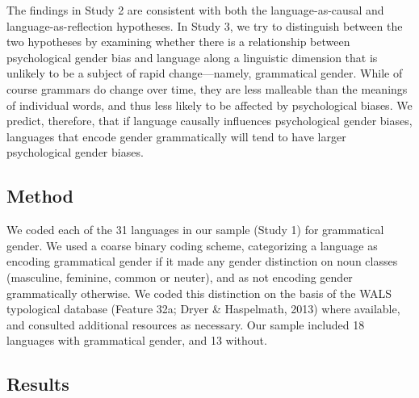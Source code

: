 \documentclass[10pt, letterpaper]{article}
\begin{document}
The findings in Study 2 are consistent with both the language-as-causal
and language-as-reflection hypotheses. In Study 3, we try to distinguish
between the two hypotheses by examining whether there is a relationship
between psychological gender bias and language along a linguistic
dimension that is unlikely to be a subject of rapid change---namely,
grammatical gender. While of course grammars do change over time, they
are less malleable than the meanings of individual words, and thus less
likely to be affected by psychological biases. We predict, therefore,
that if language causally influences psychological gender biases,
languages that encode gender grammatically will tend to have larger
psychological gender biases.

\subsection{Method}\label{method-3}

We coded each of the 31 languages in our sample (Study 1) for
grammatical gender. We used a coarse binary coding scheme, categorizing
a language as encoding grammatical gender if it made any gender
distinction on noun classes (masculine, feminine, common or neuter), and
as not encoding gender grammatically otherwise. We coded this
distinction on the basis of the WALS typological database (Feature 32a;
Dryer \& Haspelmath, 2013) where available, and consulted additional
resources as necessary. Our sample included 18 languages with
grammatical gender, and 13 without.

\subsection{Results}\label{results-3}
\end{document}
